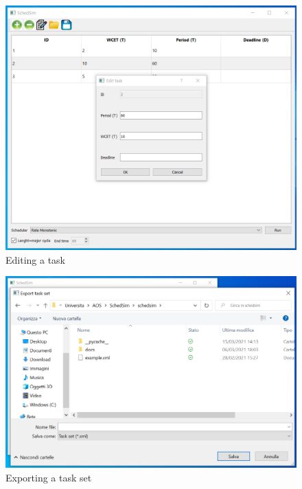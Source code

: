 \begin{figure}
\centering
\includegraphics[width=1\textwidth]{edit.png}
\caption{\label{fig:frog}Editing a task}
\end{figure}

\begin{figure}
\centering
\includegraphics[width=1\textwidth]{export.png}
\caption{\label{fig:frog}Exporting a task set}
\end{figure}

